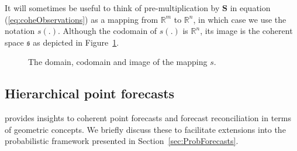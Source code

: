 \documentclass[12pt]{article}
\theoremstyle{definition}
\newtheorem{definition}{Definition}[section]
\begin{document}
It will sometimes be useful to think of pre-multiplication by $\bm{S}$ in equation (\ref{eq:coheObservations}) as a mapping from $\mathbb{R}^m$ to $\mathbb{R}^n$, in which case we use the notation $s(.)$. Although the codomain of $s(.)$ is $\mathbb{R}^n$, its image is the coherent space $\mathfrak{s}$ as depicted in Figure~\ref{fig2}.

\begin{figure}[H]
	\begin{center}
	\end{center}
	\caption{The domain, codomain and image of the mapping $s$.}\label{fig2}
\end{figure}

\subsection{Hierarchical point forecasts}\label{subsec:preliminary}

\citep{PanEtAl2019HF} provides insights to coherent point forecasts and forecast reconciliation in terms of geometric concepts. We briefly discuss these to facilitate extensions into the probabilistic framework presented in Section~\ref{sec:ProbForecasts}.

%
%
\end{document}
